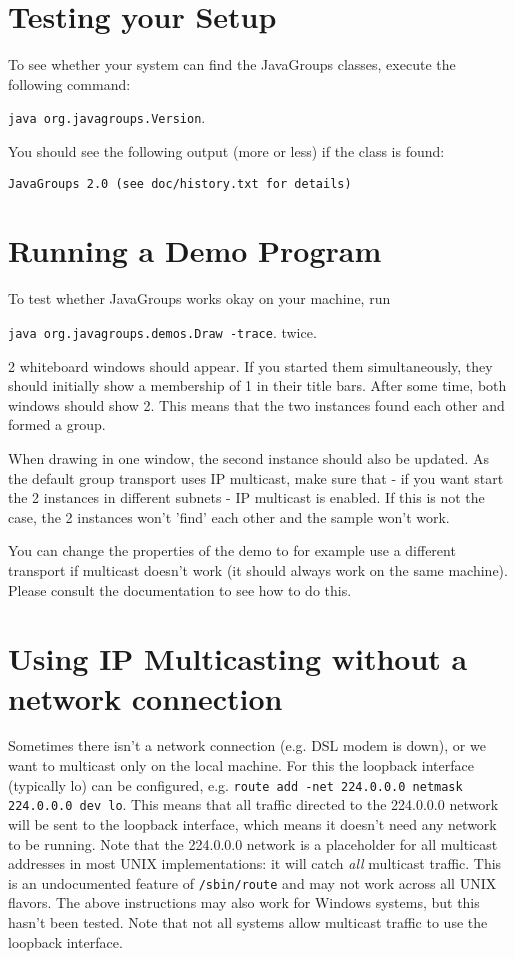   \section{Testing your Setup}

  To see whether your system can find the JavaGroups classes, execute the following
  command:

  {\tt java org.javagroups.Version}.

  You should see the following output (more or less) if the class is found: 

  {\tt JavaGroups 2.0 (see doc/history.txt for details)}


  \section{Running a Demo Program}

  To test whether JavaGroups works okay on your machine, run

  {\tt java org.javagroups.demos.Draw -trace}. twice.

  2 whiteboard windows should appear. If you started them simultaneously, they should
  initially show a membership of 1 in their title bars. After some time, both windows
  should show 2. This means that the two instances found each other and formed a
  group.

  When drawing in one window, the second instance should also be updated. As the
  default group transport uses IP multicast, make sure that - if you want start the 2
  instances in different subnets - IP multicast is enabled. If this is not the case,
  the 2 instances won't 'find' each other and the sample won't work.

  You can change the properties of the demo to for example use a different transport
  if multicast doesn't work (it should always work on the same machine). Please
  consult the documentation to see how to do this.


  \section{Using IP Multicasting without a network connection}

  Sometimes there isn't a network connection (e.g. DSL modem is down), or we want to
  multicast only on the local machine. For this the loopback interface (typically lo)
  can be configured, e.g.  {\tt route add -net 224.0.0.0 netmask 224.0.0.0 dev
  lo}. This means that all traffic directed to the 224.0.0.0 network will be sent to
  the loopback interface, which means it doesn't need any network to be running. Note
  that the 224.0.0.0 network is a placeholder for all multicast addresses in most
  UNIX implementations: it will catch {\em all} multicast traffic. This is an
  undocumented feature of {\tt /sbin/route} and may not work across all UNIX
  flavors. The above instructions may also work for Windows systems, but this hasn't
  been tested. Note that not all systems allow multicast traffic to use the loopback
  interface.

